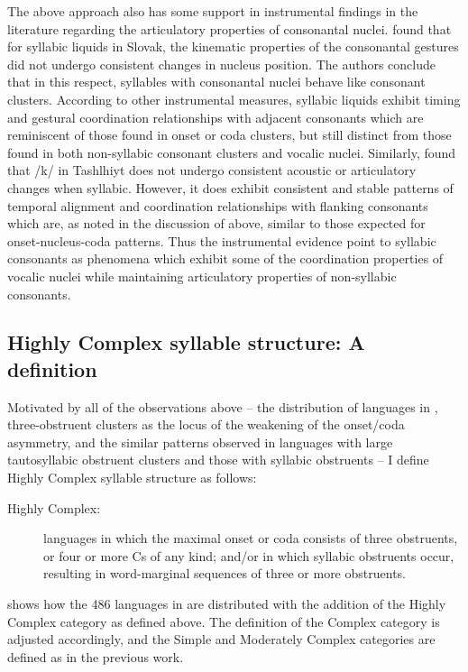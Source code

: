   The above approach also has some support in instrumental findings in the literature regarding the articulatory properties of consonantal nuclei. \citet{PouplierBeňuš2011} found that for syllabic liquids in Slovak, the kinematic properties of the consonantal gestures did not undergo consistent changes in nucleus position. The authors conclude that in this respect, syllables with consonantal nuclei behave like consonant clusters. According to other instrumental measures, syllabic liquids exhibit timing and gestural coordination relationships with adjacent consonants which are reminiscent of those found in onset or coda clusters, but still distinct from those found in both non-syllabic consonant clusters and vocalic nuclei. Similarly, \citet{FougeronRidouane2008} found that /k/ in Tashlhiyt does not undergo consistent acoustic or articulatory changes when syllabic. However, it does exhibit consistent and stable patterns of temporal alignment and coordination relationships with flanking consonants which are, as noted in the discussion of \citet{GoldsteinEtAl2007} above, similar to those expected for onset-nucleus-coda patterns. Thus the instrumental evidence point to syllabic consonants as phenomena which exhibit some of the coordination properties of vocalic nuclei while maintaining articulatory properties of non-syllabic consonants.

\subsection{Highly Complex syllable structure: A definition}\label{sec:2.2.2}

  Motivated by all of the observations above -- the distribution of languages in , three-obstruent clusters as the locus of the weakening of the onset/coda asymmetry, and the similar patterns observed in languages with large tautosyllabic obstruent clusters and those with syllabic obstruents -- I define Highly Complex syllable structure as follows:

\begin{description}
\item[Highly Complex:] languages in which the maximal onset or coda consists of three obstruents, or four or more Cs of any kind; and/or in which syllabic obstruents occur, resulting in word-marginal sequences of three or more obstruents.
\end{description}

   shows how the 486 languages in \citet{Maddieson2013a} are distributed with the addition of the Highly Complex category as defined above. The definition of the Complex category is adjusted accordingly, and the Simple and Moderately Complex categories are defined as in the previous work.

